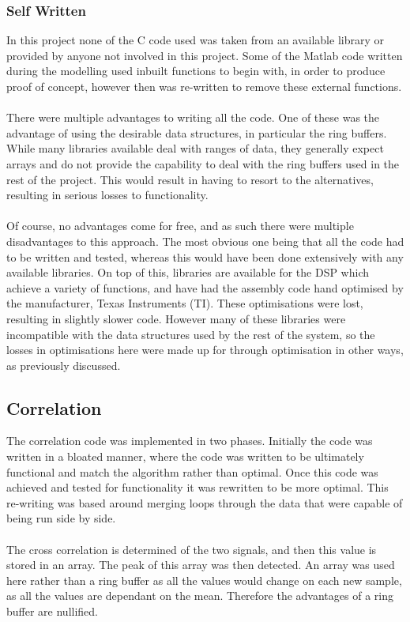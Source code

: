 \subsubsection{Self Written}
In this project none of the C code used was taken from an available library or provided by anyone not involved in this project.
Some of the Matlab code written during the modelling used inbuilt functions to begin with, in order to produce proof of concept, however then was re-written to remove these external functions.
\\
\\
There were multiple advantages to writing all the code.
One of these was the advantage of using the desirable data structures, in particular the ring buffers.
While many libraries available deal with ranges of data, they generally expect arrays and do not provide the capability to deal with the ring buffers used in the rest of the project.
This would result in having to resort to the alternatives, resulting in serious losses to functionality.
\\
\\
Of course, no advantages come for free, and as such there were multiple disadvantages to this approach.
The most obvious one being that all the code had to be written and tested, whereas this would have been done extensively with any available libraries.
On top of this, libraries are available for the DSP which achieve a variety of functions, and have had the assembly code hand optimised by the manufacturer, Texas Instruments (TI).
These optimisations were lost, resulting in slightly slower code.
However many of these libraries were incompatible with the data structures used by the rest of the system, so the losses in optimisations here were made up for through optimisation in other ways, as previously discussed.

\subsection{Correlation}
The correlation code was implemented in two phases.
Initially the code was written in a bloated manner, where the code was written to be ultimately functional and match the algorithm rather than optimal.
Once this code was achieved and tested for functionality it was rewritten to be more optimal.
This re-writing was based around merging loops through the data that were capable of being run side by side.
\\
\\
The cross correlation is determined of the two signals, and then this value is stored in an array.
The peak of this array was then detected.
An array was used here rather than a ring buffer as all the values would change on each new sample, as all the values are dependant on the mean.
Therefore the advantages of a ring buffer are nullified.

